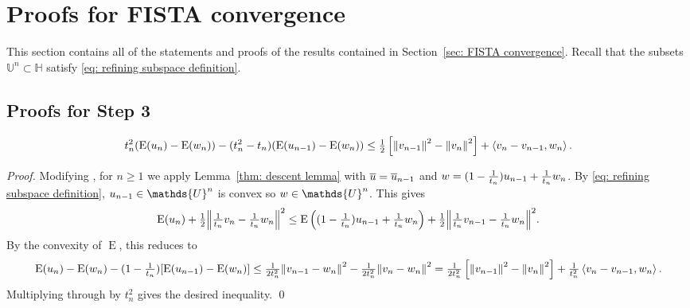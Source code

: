 \documentclass[smallextended]{svjour3}
\let\F\mathds\let\C\mathcal\newcommand{\R}{\F{R}}\newcommand{\A}{\tens{A}}
\newcommand{\norm}[1]{{\left\lVert #1 \right\rVert}}
\newcommand{\IP}[2]{\left\langle #1,#2 \right\rangle}
\newcommand{\op}[1]{\operatorname{#1}}
\newcommand{\1}{\F{1}}
\newcommand*{\var}[1]{%
	\IfEqCase{#1}{%
		{0}{u}%
		{1}{v}%
		{2}{w}%
	}[u#1]%
}
\begin{document}
	
	\appendix
	\section{Proofs for FISTA convergence}\label{app: FISTA convergence}
	This section contains all of the statements and proofs of the results contained in Section~\ref{sec: FISTA convergence}. Recall that the subsets $\F{U}^n\subset\F H$ satisfy \eqref{eq: refining subspace definition}.
	
	\subsection{Proofs for Step 3}
	
	\begin{theorem}\label{app:thm: one step FISTA}
		\begin{equation}
			t_{n}^2(\op{E}(\var0_{n}) - \op{E}(\var2_n)) - (t_{n}^2-t_{n})(\op{E}(\var0_{n-1})-\op{E}(\var2_n)) \leq \tfrac1{2}\left[\norm{\var1_{n-1}}^2-\norm{\var1_{n}}^2\right] + \IP{\var1_{n}-\var1_{n-1}}{\var2_n}.
			\label{app:eq: one-step FISTA}
		\end{equation}
	\end{theorem}
	\begin{proof}
		Modifying \cite[Thm 3.2]{Chambolle2015}, for $n\geq1$ we apply Lemma~\ref{thm: descent lemma} with $\bar{\var0} = \bar{\var0}_{n-1}$ and $\var2 = (1-\frac{1}{t_{n}})\var0_{n-1} + \frac{1}{t_{n}}\var2_n$. By \eqref{eq: refining subspace definition}, $\var0_{n-1}\in\F{U}^n$ is convex so $\var2\in \F{U}^n$. This gives
		\begin{equation}
			\op{E}(\var0_{n}) + \tfrac12\norm{\tfrac{1}{t_{n}}\var1_{n}-\tfrac{1}{t_{n}}\var2_n}^2 \leq \op{E}\left((1-\tfrac{1}{t_{n}})\var0_{n-1}+\tfrac{1}{t_{n}}\var2_n\right) + \tfrac12\norm{\tfrac{1}{t_{n}}\var1_{n-1}-\tfrac{1}{t_{n}}\var2_n}^2.
		\end{equation}
		By the convexity of $\op{E}$, this reduces to
		\begin{equation}
			\op{E}(\var0_{n}) - \op{E}(\var2_n) - (1-\tfrac{1}{t_{n}})[\op{E}(\var0_{n-1})-\op{E}(\var2_n)] \leq \tfrac1{2t_{n}^2}\norm{\var1_{n-1}-\var2_n}^2 - \tfrac1{2t_{n}^2}\norm{\var1_{n}-\var2_n}^2 = \tfrac1{2t_{n}^2}\left[\norm{\var1_{n-1}}^2-\norm{\var1_{n}}^2\right] + \tfrac1{t_{n}^2}\IP{\var1_{n}-\var1_{n-1}}{\var2_n}.
		\end{equation}
		Multiplying through by $t_n^2$ gives the desired inequality.
		\qed\end{proof}
	
\end{document}
